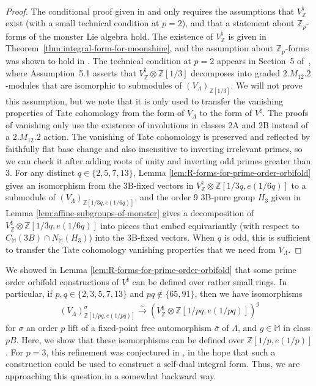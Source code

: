 \documentclass[pdftex]{sigma}
\newcommand{\bM}{\mathbb{M}}
\newcommand{\bZ}{\mathbb{Z}}
\newcommand{\simto}{\overset{\sim}{\to}}
\theoremstyle{definition}
\begin{document}
\begin{proof}The conditional proof given in \cite{BR96} and \cite{B98} only requires the assumptions that $V^\natural_{\bZ}$ exist (with a small technical condition at $p=2$), and that a statement about $\bZ_p$-forms of the monster Lie algebra hold. The existence of $V^\natural_{\bZ}$ is given in Theorem~\ref{thm:integral-form-for-moonshine}, and the assumption about $\bZ_p$-forms was shown to hold in \cite{B99}. The technical condition at $p=2$ appears in Section~5 of~\cite{BR96}, where Assumption~5.1 asserts that $V^\natural_\bZ \otimes \bZ[1/3]$ decomposes into graded $2.M_{12}.2$-modules that are isomorphic to submodules of $(V_\Lambda)_{\bZ[1/3]}$. We will not prove this assumption, but we note that it is only used to transfer the vanishing properties of Tate cohomology from the form of $V_\Lambda$ to the form of $V^\natural$. The proofs of vanishing only use the existence of involutions in classes 2A and 2B instead of a $2.M_{12}.2$ action. The vanishing of Tate cohomology is preserved and reflected by faithfully flat base change and also insensitive to inverting irrelevant primes, so we can check it after adding roots of unity and inverting odd primes greater than 3. For any distinct $q \in \{ 2,5,7,13\}$, Lemma \ref{lem:R-forms-for-prime-order-orbifold} gives an isomorphism from the 3B-fixed vectors in $V^\natural_\bZ \otimes \bZ[1/3q,e(1/6q)]$ to a submodule of $(V_\Lambda)_{\bZ[1/3q,e(1/6q)]}$, and the order 9 3B-pure group $H_3$ given in Lemma \ref{lem:affine-subgroups-of-monster} gives a decomposition of $V^\natural_\bZ \otimes \bZ[1/3q,e(1/6q)]$ into pieces that embed equivariantly (with respect to $C_{\bM}(3B) \cap N_{\bM}(H_3)$) into the 3B-fixed vectors. When $q$ is odd, this is sufficient to transfer the Tate cohomology vanishing properties that we need from $V_\Lambda$.
\end{proof}

We showed in Lemma \ref{lem:R-forms-for-prime-order-orbifold} that some prime order orbifold constructions of $V^\natural$ can be defined over rather small rings. In particular, if $p,q \in \{2,3,5,7,13\}$ and $pq \not\in \{65,91\}$, then we have isomorphisms
\begin{gather*} (V_\Lambda)_{\bZ[1/pq,e(1/pq)]}^\sigma \simto (V^\natural_\bZ \otimes \bZ[1/pq,e(1/pq)])^g \end{gather*}
for $\sigma$ an order $p$ lift of a fixed-point free automorphism $\bar{\sigma}$ of $\Lambda$, and $g \in \bM$ in class $pB$. Here, we show that these isomorphisms can be defined over $\bZ[1/p,e(1/p)]$. For $p=3$, this refinement was conjectured in \cite{BR96}, in the hope that such a construction could be used to construct a self-dual integral form. Thus, we are approaching this question in a somewhat backward way.
\end{document}
